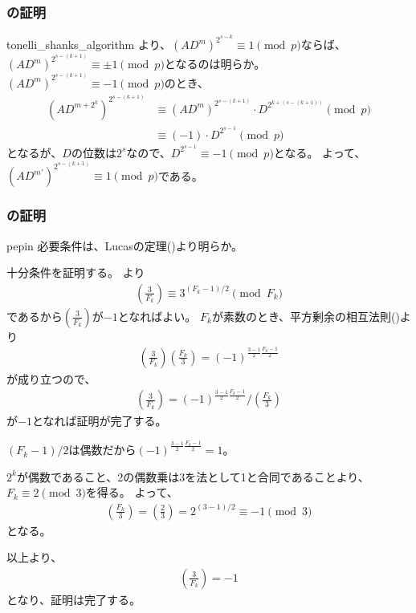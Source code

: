 \subsubsection{の証明}
\begin{prProof}{tonelli_shanks_algorithm}
より、$(AD^m)^{2^{s-k}}\equiv1\pmod{p}$ならば、$(AD^m)^{2^{s-(k+1)}}\equiv\pm1\pmod{p}$となるのは明らか。
$(AD^m)^{2^{s-(k+1)}}\equiv-1\pmod{p}$のとき、
\begin{align*}
(AD^{m + 2^k})^{2^{s-(k+1)}} &\equiv (AD^m)^{2^{s-(k+1)}}\cdot D^{2^{k+(s-(k+1))}}\pmod{p}\\
&\equiv (-1)\cdot D^{2^{s-1}}\pmod{p}
\end{align*}
となるが、$D$の位数は$2^s$なので、$D^{2^{s-1}}\equiv-1\pmod{p}$となる。
よって、$(AD^{m'})^{2^{s-(k+1)}}\equiv1\pmod{p}$である。
\end{prProof}

\subsubsection{の証明}
\begin{thProof}{pepin}
必要条件は、Lucasの定理()より明らか。

十分条件を証明する。
より
\begin{align*}
\left(\frac{3}{F_k}\right) \equiv 3^{(F_k-1)/2} \pmod{F_k}
\end{align*}
であるから$\left(\frac{3}{F_k}\right)$が$-1$となればよい。
$F_k$が素数のとき、平方剰余の相互法則()より
\begin{align*}
\left(\frac{3}{F_k}\right)\left(\frac{F_k}{3}\right) = (-1)^{\frac{3-1}{2}\frac{F_k-1}{2}}
\end{align*}
が成り立つので、
\begin{align*}
\left(\frac{3}{F_k}\right) = (-1)^{\frac{3-1}{2}\frac{F_k-1}{2}} \bigg/ \left(\frac{F_k}{3}\right)
\end{align*}
が$-1$となれば証明が完了する。

$(F_k-1)/2$は偶数だから$(-1)^{\frac{3-1}{2}\frac{F_k-1}{2}}=1$。

$2^k$が偶数であること、2の偶数乗は3を法として1と合同であることより、$F_k\equiv2\pmod{3}$を得る。
よって、
\begin{align*}
\left(\frac{F_k}{3}\right) = \left(\frac{2}{3}\right) = 2^{(3-1)/2} \equiv -1 \pmod{3}
\end{align*}
となる。

以上より、
\begin{align*}
\left(\frac{3}{F_k}\right) = -1
\end{align*}
となり、証明は完了する。
\end{thProof}

